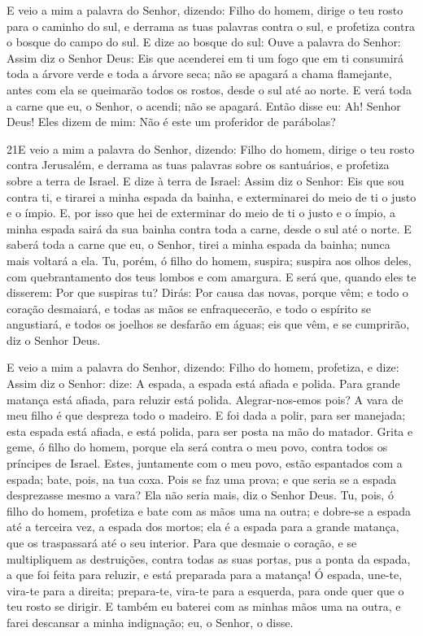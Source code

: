 E veio a mim a palavra do Senhor, dizendo: Filho do homem,
dirige o teu rosto para o caminho do sul, e derrama as tuas palavras
contra o sul, e profetiza contra o bosque do campo do sul. E
dize ao bosque do sul: Ouve a palavra do Senhor: Assim diz o Senhor
Deus: Eis que acenderei em ti um fogo que em ti consumirá toda a
árvore verde e toda a árvore seca; não se apagará a chama
flamejante, antes com ela se queimarão todos os rostos, desde o sul
até ao norte. E verá toda a carne que eu, o Senhor, o acendi;
não se apagará. Então disse eu: Ah! Senhor Deus! Eles dizem
de mim: Não é este um proferidor de parábolas?

\medskip

\lettrine{21} E veio a mim a palavra do Senhor, dizendo:
Filho do homem, dirige o teu rosto contra Jerusalém, e derrama
as tuas palavras sobre os santuários, e profetiza sobre a terra de
Israel. E dize à terra de Israel: Assim diz o Senhor: Eis que
sou contra ti, e tirarei a minha espada da bainha, e exterminarei do
meio de ti o justo e o ímpio. E, por isso que hei de exterminar
do meio de ti o justo e o ímpio, a minha espada sairá da sua bainha
contra toda a carne, desde o sul até o norte. E saberá toda a
carne que eu, o Senhor, tirei a minha espada da bainha; nunca mais
voltará a ela. Tu, porém, ó filho do homem, suspira; suspira aos
olhos deles, com quebrantamento dos teus lombos e com amargura.
E será que, quando eles te disserem: Por que suspiras tu? Dirás:
Por causa das novas, porque vêm; e todo o coração desmaiará, e todas
as mãos se enfraquecerão, e todo o espírito se angustiará, e todos
os joelhos se desfarão em águas; eis que vêm, e se cumprirão, diz o
Senhor Deus.

E veio a mim a palavra do Senhor, dizendo: Filho do homem,
profetiza, e dize: Assim diz o Senhor: dize: A espada, a espada está
afiada e polida. Para grande matança está afiada, para
reluzir está polida. Alegrar-nos-emos pois? A vara de meu filho é
que despreza todo o madeiro. E foi dada a polir, para ser
manejada; esta espada está afiada, e está polida, para ser posta na
mão do matador. Grita e geme, ó filho do homem, porque ela
será contra o meu povo, contra todos os príncipes de Israel. Estes,
juntamente com o meu povo, estão espantados com a espada; bate,
pois, na tua coxa. Pois se faz uma prova; e que seria se a
espada desprezasse mesmo a vara? Ela não seria mais, diz o Senhor
Deus. Tu, pois, ó filho do homem, profetiza e bate com as
mãos uma na outra; e dobre-se a espada até a terceira vez, a espada
dos mortos; ela é a espada para a grande matança, que os traspassará
até o seu interior. Para que desmaie o coração, e se
multipliquem as destruições, contra todas as suas portas, pus a
ponta da espada, a que foi feita para reluzir, e está preparada para
a matança! Ó espada, une-te, vira-te para a direita;
prepara-te, vira-te para a esquerda, para onde quer que o teu rosto
se dirigir. E também eu baterei com as minhas mãos uma na
outra, e farei descansar a minha indignação; eu, o Senhor, o disse.

